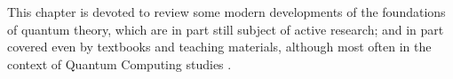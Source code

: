 This chapter is devoted to review some modern developments
of the foundations of quantum theory, which are in part
still subject of active research; and in part covered
even by textbooks and teaching materials, although
most often in the context of Quantum Computing studies
\parencite{PreskillNotes, Haroche_Exploring, Nakahara, NielsenChuang}.